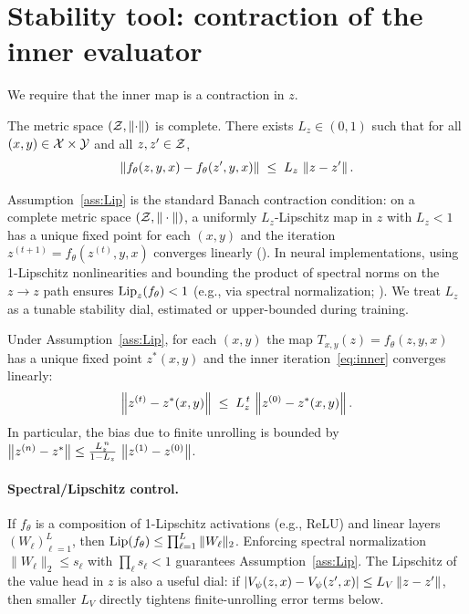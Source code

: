 \documentclass[11pt]{article}
\begin{document}
\section{Stability tool: contraction of the inner evaluator}
We require that the inner map is a contraction in $z$.

\begin{assumption}\label{ass:Lip}
The metric space $(\mathcal{Z},\left\lVert \cdot \right\rVert)$ is complete. There exists $L_z\in(0,1)$ such that for all $(x,y)\in\mathcal{X}\times\mathcal{Y}$ and all $z,z'\in\mathcal{Z}$,
\begin{equation}
\left\lVert f_\theta(z,y,x)-f_\theta(z',y,x) \right\rVert \;\le\; L_z\,\left\lVert z-z' \right\rVert.
\end{equation}
\end{assumption}

\begin{remark}
Assumption~\ref{ass:Lip} is the standard Banach contraction condition:
on a complete metric space $(\mathcal{Z},\|\cdot\|)$, a uniformly $L_z$-Lipschitz
map in $z$ with $L_z<1$ has a unique fixed point for each $(x,y)$ and the
iteration $z^{(t+1)}=f_\theta(z^{(t)},y,x)$ converges linearly
(\cite{Denardo1967}). In neural implementations, using 1-Lipschitz
nonlinearities and bounding the product of spectral norms on the $z\!\to\!z$
path ensures $\mathrm{Lip}_z(f_\theta)<1$ (e.g., via spectral normalization;
\cite{Miyato2018}). We treat $L_z$ as a tunable stability dial, estimated
or upper-bounded during training.
\end{remark}

\begin{proposition}\label{prop:banach}
Under Assumption~\ref{ass:Lip}, for each $(x,y)$ the map $T_{x,y}(z)=f_\theta(z,y,x)$ has a unique fixed point $z^*(x,y)$ and the inner iteration~\eqref{eq:inner} converges linearly:
\begin{equation}
\left\lVert z^{(t)} - z^*(x,y) \right\rVert \;\le\; L_z^{\,t}\,\left\lVert z^{(0)} - z^*(x,y) \right\rVert.
\end{equation}
In particular, the bias due to finite unrolling is bounded by
$\left\lVert z^{(n)}-z^* \right\rVert\le \frac{L_z^{\,n}}{1-L_z}\,\left\lVert z^{(1)}-z^{(0)} \right\rVert$.
\end{proposition}

\paragraph{Spectral/Lipschitz control.}
If $f_\theta$ is a composition of 1-Lipschitz activations (e.g., ReLU) and linear layers $(W_\ell)_{\ell=1}^L$, then
$\mathrm{Lip}(f_\theta)\le\prod_{\ell=1}^L \|W_\ell\|_2$.
Enforcing spectral normalization $\|W_\ell\|_2\le s_\ell$ with $\prod_\ell s_\ell<1$ guarantees Assumption~\ref{ass:Lip}. The Lipschitz of the value head in $z$ is also a useful dial: if $\left\lvert V_\psi(z,x)-V_\psi(z',x) \right\rvert\le L_V\left\lVert z-z' \right\rVert$, then smaller $L_V$ directly tightens finite-unrolling error terms below.
\end{document}

